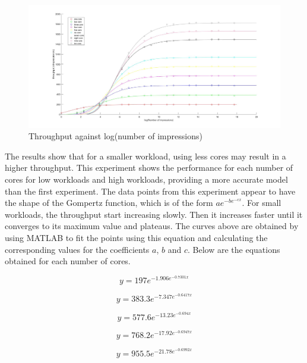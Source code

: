 \documentclass[a4paper,11pt]{article}
\begin{document}
\begin{figure}[H]
	\hspace*{-2.8cm}  
	\includegraphics[scale=0.3]{images/logimpressions_throughput}
	\caption{Throughput against log(number of impressions)}
\end{figure}

\noindent The results show that for a smaller workload, using less cores may result in a higher throughput. This experiment shows the performance for each number of cores for low workloads and high workloads, providing a more accurate model than the first experiment. The data points from this experiment appear to have the shape of the Gompertz function\cite{Gompertz}, which is of the form $ae^{-be^{-cx}}$.  For small workloads, the throughput start increasing slowly. Then it increases faster until it converges to its maximum value and plateaus. The curves above are obtained by using MATLAB\cite{MATLAB} to fit the points using this equation and calculating the corresponding values for the coefficients $a$, $b$ and $c$. Below are the equations obtained for each number of cores.

\begin{equation}
y = 197e^{-1.906e^{-0.7301x}}
\end{equation}

\begin{equation}
y = 383.3e^{-7.347e^{-0.6417x}}
\end{equation}

\begin{equation}
y = 577.6e^{-13.23e^{-0.694x}}
\end{equation}

\begin{equation}
y = 768.2e^{-17.92e^{-0.6947x}}
\end{equation}

\begin{equation}
y = 955.5e^{-21.78e^{-0.6992x}}
\end{equation}
\end{document}
